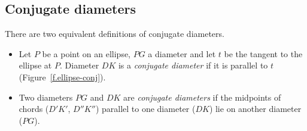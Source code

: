 
\subsection*{Conjugate diameters}

\begin{definition}\label{def.conjugate}
There are two equivalent definitions of conjugate diameters.
\begin{itemize}
\item Let $P$ be a point on an ellipse, $PG$ a diameter and let $t$ be the tangent to the ellipse at $P$. Diameter $DK$ is a \emph{conjugate diameter} if it is parallel to $t$ (Figure~\ref{f.ellipse-conj}).
\item Two diameters $PG$ and $DK$ are \emph{conjugate diameters} if the midpoints of chords ($D'K'$, $D''K''$) parallel to one diameter ($DK$) lie on another diameter ($PG$).
\end{itemize}
\end{definition}


